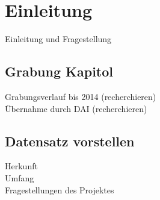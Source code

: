 \section{Einleitung}

Einleitung und Fragestellung\\
\cite{houghpatent}

\subsection{Grabung Kapitol}
Grabungsverlauf bis 2014 (recherchieren)\\
Übernahme durch DAI (recherchieren)\\

\subsection{Datensatz vorstellen}
Herkunft\\
Umfang\\
Fragestellungen des Projektes\\




